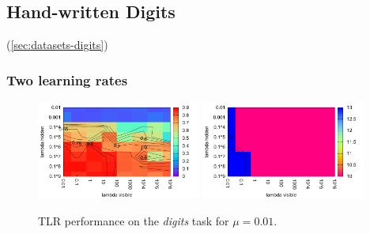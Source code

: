 

\subsection{Hand-written Digits} 
\label{sec:results-digits} 

(\ref{sec:datasets-digits}) 

\subsubsection{Two learning rates} 
\label{sec:tlr-digits} 

\begin{figure}[H]
  \centering
  \includegraphics[width=0.48\textwidth]{img/tlr-digits-psf.pdf} 
  \includegraphics[width=0.48\textwidth]{img/tlr-digits-epoch.pdf}     
  \caption{TLR performance on the \emph{digits} task for $\mu = 0.01$.}
  \label{fig:results-tlr-digits-success}
\end{figure}

